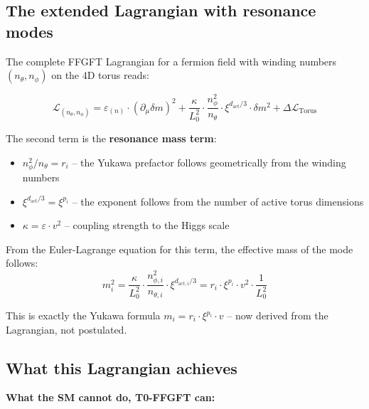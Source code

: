 \subsection{The extended Lagrangian with resonance modes}

The complete FFGFT Lagrangian for a fermion field with winding
numbers $(n_\theta, n_\phi)$ on the 4D torus reads:

\begin{equation}
    \mathcal{L}_{(n_\theta, n_\phi)} = \varepsilon_{(n)} \cdot
    (\partial_\mu \delta m)^2
    + \frac{\kappa}{L_0^2} \cdot \frac{n_\phi^2}{n_\theta} \cdot
    \xi^{d_{\text{act}}/3} \cdot \delta m^2
    + \Delta\mathcal{L}_{\text{Torus}}
    \label{eq:L_extended_en}
\end{equation}

The second term is the \textbf{resonance mass term}:
\begin{itemize}
    \item $n_\phi^2/n_\theta = r_i$ -- the Yukawa prefactor follows
          geometrically from the winding numbers
    \item $\xi^{d_{\text{act}}/3} = \xi^{p_i}$ -- the exponent
          follows from the number of active torus dimensions
    \item $\kappa = \varepsilon \cdot v^2$ -- coupling strength
          to the Higgs scale
\end{itemize}

From the Euler-Lagrange equation for this term, the effective
mass of the mode follows:
\begin{equation}
    m_i^2 = \frac{\kappa}{L_0^2} \cdot \frac{n_{\phi,i}^2}{n_{\theta,i}}
    \cdot \xi^{d_{\text{act},i}/3}
    = r_i \cdot \xi^{p_i} \cdot v^2 \cdot \frac{1}{L_0^2}
\end{equation}

This is exactly the Yukawa formula $m_i = r_i \cdot \xi^{p_i} \cdot v$
-- now derived from the Lagrangian, not postulated.

\subsection{What this Lagrangian achieves}

\textbf{What the SM cannot do, T0-FFGFT can:}

